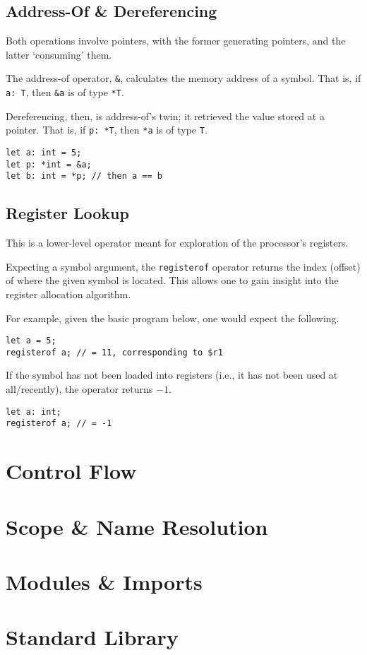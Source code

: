 \documentclass{article}
\begin{document}
    \subsection{Address-Of \& Dereferencing}\label{subsec:address-of-&-dereferencing}

    Both operations involve pointers, with the former generating pointers, and the latter `consuming' them.

    The address-of operator, \texttt{\&}, calculates the memory address of a symbol.
    That is, if \texttt{a: T}, then \texttt{\&a} is of type \texttt{*T}.

    Dereferencing, then, is address-of's twin; it retrieved the value stored at a pointer.
    That is, if \texttt{p: *T}, then \texttt{*a} is of type \texttt{T}.

    \begin{lstlisting}[language=CustomLang]
let a: int = 5;
let p: *int = &a;
let b: int = *p; // then a == b
    \end{lstlisting}

    \subsection{Register Lookup}

    This is a lower-level operator meant for exploration of the processor's registers.

    Expecting a symbol argument, the \texttt{registerof} operator returns the index (offset) of where the given symbol is located.
    This allows one to gain insight into the register allocation algorithm.

    For example, given the basic program below, one would expect the following.

    \begin{lstlisting}[language=CustomLang]
let a = 5;
registerof a; // = 11, corresponding to $r1
    \end{lstlisting}

    If the symbol has not been loaded into registers (i.e., it has not been used at all/recently), the operator returns \(-1\).

    \begin{lstlisting}[language=CustomLang]
let a: int;
registerof a; // = -1
    \end{lstlisting}

    \section{Control Flow}

    \section{Scope \& Name Resolution}\label{sec:scope}

    \section{Modules \& Imports}

    \section{Standard Library}
\end{document}
